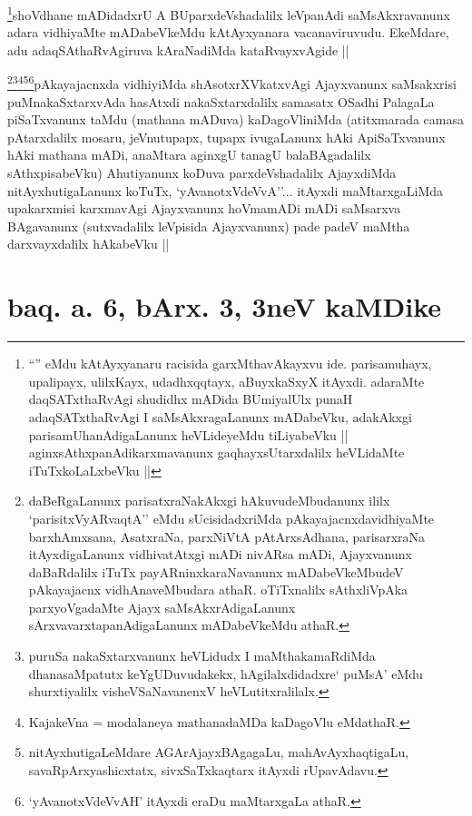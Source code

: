\begin{artha}
\footnote{``\stext'' eMdu kAtAyxyanaru racisida garxMthavAkayxvu ide. parisamuhayx, upalipayx, ulilxKayx, udadhxqqtayx, aBuyxkaSxyX itAyxdi. adaraMte daqSATxthaRvAgi shudidhx mADida BUmiyalUlx punaH adaqSATxthaRvAgi I saMsAkxragaLanunx mADabeVku, adakAkxgi parisamUhanAdigaLanunx heVLideyeMdu tiLiyabeVku || aginxsAthxpanAdikarxmavanunx gaqhayxsUtarxdalilx heVLidaMte iTuTxkoLaLxbeVku ||}shoVdhane mADidadxrU A BUparxdeVshadalilx leVpanAdi saMsAkxravanunx adara vidhiyaMte mADabeVkeMdu kAtAyxyanara vacanaviruvudu. EkeMdare, adu adaqSAthaRvAgiruva kAraNadiMda kataRvayxvAgide ||
\end{artha}

\begin{artha}
\footnote{daBeRgaLanunx parisatxraNakAkxgi hAkuvudeMbudanunx ililx `parisitxVyARvaqtA'' eMdu sUcisidadxriMda pAkayajacnxdavidhiyaMte barxhAmxsana, AsatxraNa, parxNiVtA pAtArxsAdhana, parisarxraNa itAyxdigaLanunx vidhivatAtxgi mADi nivARsa mADi, Ajayxvanunx daBaRdalilx iTuTx payARninxkaraNavanunx mADabeVkeMbudeV pAkayajacnx vidhAnaveMbudara athaR. oTiTxnalilx sAthxliVpAka parxyoVgadaMte Ajayx saMsAkxrAdigaLanunx sArxvavarxtapanAdigaLanunx mADabeVkeMdu athaR.}\footnote{puruSa nakaSxtarxvanunx heVLidudx I maMthakamaRdiMda dhanasaMpatutx keYgUDuvudakekx, hAgilalxdidadxre` puMsA' eMdu shurxtiyalilx visheVSaNavanenxV heVLutitxralilalx.}\footnote{KajakeVna = modalaneya mathanadaMDa kaDagoVlu eMdathaR.}\footnote{nitAyxhutigaLeMdare AGArAjayxBAgagaLu, mahAvAyxhaqtigaLu, savaRpArxyashicxtatx, sivxSaTxkaqtarx itAyxdi rUpavAdavu.}\footnote{`yAvanotxVdeVvAH' itAyxdi eraDu maMtarxgaLa athaR.}pAkayajacnxda vidhiyiMda shAsotxrXVkatxvAgi Ajayxvanunx saMsakxrisi puMnakaSxtarxvAda hasAtxdi nakaSxtarxdalilx samasatx OSadhi PalagaLa piSaTxvanunx taMdu (mathana mADuva) kaDagoVliniMda (atitxmarada camasa pAtarxdalilx mosaru, jeVnutupapx, tupapx ivugaLanunx hAki ApiSaTxvanunx hAki mathana mADi, anaMtara aginxgU tanagU balaBAgadalilx sAthxpisabeVku) Ahutiyanunx koDuva parxdeVshadalilx AjayxdiMda nitAyxhutigaLanunx koTuTx, `yAvanotxVdeVvA''... itAyxdi maMtarxgaLiMda upakarxmisi karxmavAgi Ajayxvanunx hoVmamADi mADi saMsarxva BAgavanunx (sutxvadalilx leVpisida Ajayxvanunx) pade padeV maMtha darxvayxdalilx hAkabeVku ||
\end{artha}

\section{baq. a. 6, bArx. 3, 3neV kaMDike}


